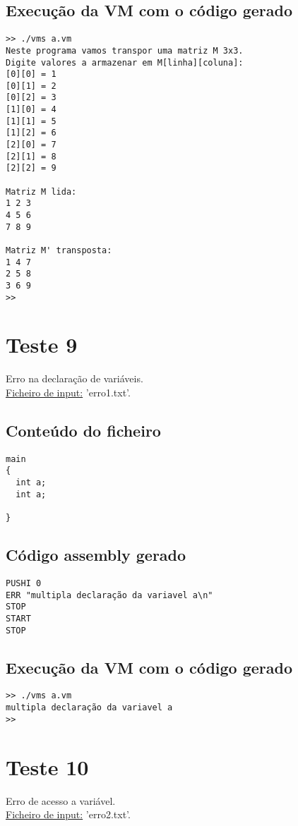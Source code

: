 \documentclass[11pt,a4paper]{report}%
\begin{document}
\subsection{Execução da VM com o código gerado}

\begin{verbatim}
>> ./vms a.vm
Neste programa vamos transpor uma matriz M 3x3.
Digite valores a armazenar em M[linha][coluna]:
[0][0] = 1
[0][1] = 2
[0][2] = 3
[1][0] = 4
[1][1] = 5
[1][2] = 6
[2][0] = 7
[2][1] = 8
[2][2] = 9

Matriz M lida:
1 2 3 
4 5 6 
7 8 9 

Matriz M' transposta:
1 4 7 
2 5 8 
3 6 9 
>>
\end{verbatim}



\section{Teste 9}
Erro na declaração de variáveis. \\
\underline{Ficheiro de input:} 'erro1.txt'.

\subsection{Conteúdo do ficheiro}

\begin{verbatim}
main
{
  int a;
  int a;

}
\end{verbatim}


\subsection{Código assembly gerado}
\begin{verbatim}
PUSHI 0
ERR "multipla declaração da variavel a\n"
STOP
START
STOP
\end{verbatim}


\subsection{Execução da VM com o código gerado}

\begin{verbatim}
>> ./vms a.vm
multipla declaração da variavel a
>>
\end{verbatim}

\section{Teste 10}
Erro de acesso a variável. \\
\underline{Ficheiro de input:} 'erro2.txt'.
\end{document}
